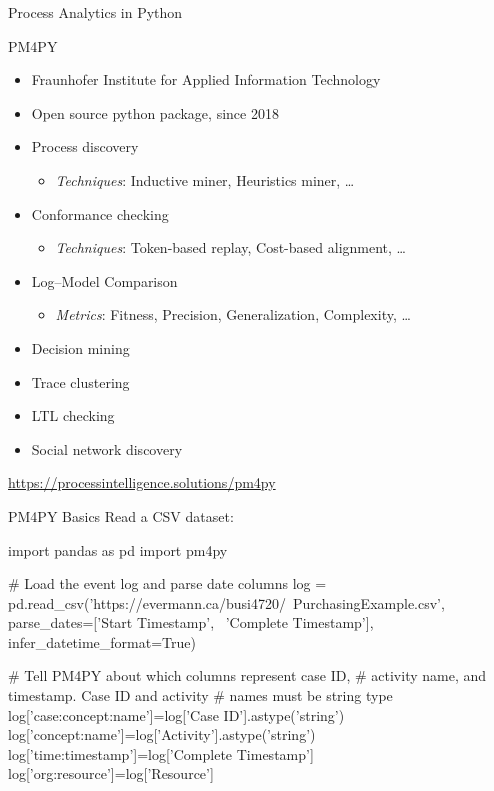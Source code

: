 \documentclass[ignorenonframetext,xcolor=x11names]{beamer}
\begin{document}
\begin{frame}{Process Analytics in Python}
\begin{block}{PM4PY}
\begin{itemize}
   \item Fraunhofer Institute for Applied Information Technology
   \item Open source python package, since 2018
   \item Process discovery
   \begin{itemize}
       \item \emph{Techniques}: Inductive miner, Heuristics miner, \ldots
   \end{itemize}
   \item Conformance checking
   \begin{itemize}
       \item \emph{Techniques}: Token-based replay, Cost-based alignment, \ldots
   \end{itemize}
   \item Log--Model Comparison
   \begin{itemize}
       \item \emph{Metrics}: Fitness, Precision, Generalization, Complexity, \ldots
   \end{itemize}
   \item Decision mining
   \item Trace clustering
   \item LTL checking
   \item Social network discovery
\end{itemize}
\end{block}
\vspace{.5\baselineskip}
\url{https://processintelligence.solutions/pm4py}

\end{frame}

\begin{frame}[fragile]{PM4PY Basics}
Read a CSV dataset:
\footnotesize
\begin{pythoncode}
import pandas as pd
import pm4py

# Load the event log and parse date columns
log = pd.read_csv('https://evermann.ca/busi4720/\
   PurchasingExample.csv', 
   parse_dates=['Start Timestamp', \
      'Complete Timestamp'], 
   infer_datetime_format=True)

# Tell PM4PY about which columns represent case ID,
# activity name, and timestamp. Case ID and activity
# names must be string type
log['case:concept:name']=log['Case ID'].astype('string')
log['concept:name']=log['Activity'].astype('string')
log['time:timestamp']=log['Complete Timestamp']
log['org:resource']=log['Resource']
\end{pythoncode}

\end{frame}
\end{document}
